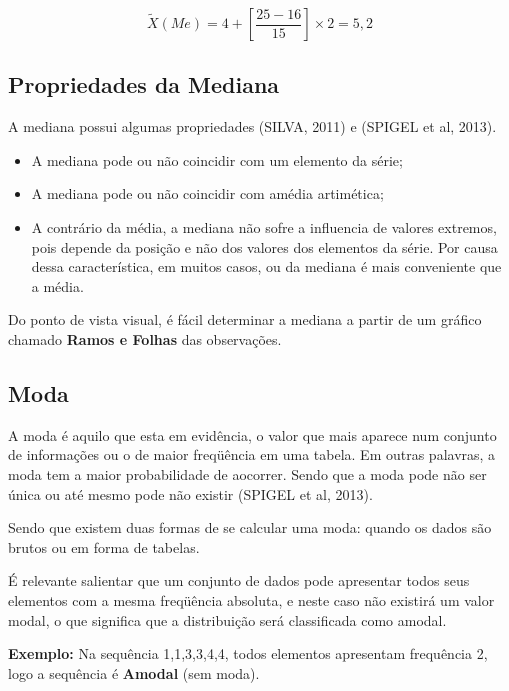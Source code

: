 \begin{equation}\label{}
    \tilde{X}(Me)= 4+\left[\frac{25-16}{15}\right]\times 2 = 5,2
\end{equation}






\newpage

\subsection{Propriedades da Mediana}

A mediana possui algumas propriedades (SILVA, 2011) e (SPIGEL et al, 2013).

\begin{itemize}
\item A mediana pode ou não coincidir com um elemento da série;
\item A mediana pode ou não coincidir com amédia artimética;
\item A contrário da média, a mediana não sofre a influencia de valores extremos, pois depende da posição e não dos valores dos elementos da série. Por causa dessa característica, em muitos casos, ou da mediana é mais conveniente que a média.    
\end{itemize}


Do ponto de vista visual, é fácil determinar a mediana a partir de um gráfico chamado \textbf{Ramos e Folhas} das observações.




\subsection{Moda}

A moda é aquilo que esta em evidência, o valor que mais aparece num conjunto de informações ou o de maior freqüência em uma tabela. Em outras palavras, a moda tem a maior probabilidade de aocorrer. Sendo que a moda pode não ser única ou até mesmo pode não existir (SPIGEL et al, 2013).\vskip0.3cm


Sendo que existem duas formas de se calcular uma moda: quando os dados são brutos ou em forma de tabelas.\vskip0.3cm

É relevante salientar que um conjunto de dados pode apresentar todos seus elementos com a mesma freqüência absoluta, e neste caso não existirá um valor modal, o que significa que a distribuição será classificada como amodal.\vskip0.3cm

\textbf{Exemplo:} Na sequência 1,1,3,3,4,4, todos elementos apresentam frequência 2, logo a sequência é \textbf{Amodal} (sem moda).\vskip0.3cm

